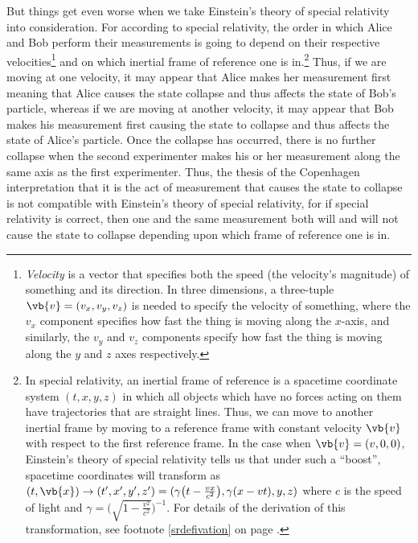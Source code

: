 \documentclass[12pt]{report}
\begin{document}
But things get even worse when we take Einstein's theory of special relativity into consideration. For according to special relativity, the order in which Alice and Bob perform their measurements is going to depend on their respective velocities\footnote{\label{Velocityfootnote}\emph{Velocity} is a vector that specifies both the speed (the velocity's magnitude) of something and its direction. In three dimensions, a three-tuple $\vb{v}=(v_x, v_y, v_z)$  %
%
is needed to specify the velocity of something, where the $v_x$ component specifies how fast the thing is moving along the $x$-axis, and similarly, the $v_y$ and $v_z$ components specify how fast the thing is moving along the $y$ and $z$ axes respectively.} and on which inertial frame of reference one is in.\footnote{\label{inertialfootnote}In special relativity, an inertial frame of reference is a spacetime coordinate system $(t, x, y, z)$   %
%
in which all objects which have no forces acting on them have trajectories that are straight lines. Thus, we can move to another inertial frame by moving to a reference frame with constant velocity $\vb{v}$ with respect to the first reference frame. In the case when $\vb{v}=(v, 0, 0)$, Einstein's theory of special relativity tells us that under such a “boost”, spacetime coordinates will transform as $(t,\vb{x})\rightarrow(t',x',y',z')=(\gamma\big(t - \frac{vx}{c^2}\big),\gamma(x-vt),y,z)$  %
%
where $c$  %
%
is the speed of light and $\gamma=\Big(\sqrt{1-\frac{v^2}{c^2}}\Big)^{-1}.$ For details of the derivation of this transformation, see footnote \ref{srdefivation} on page \pageref{srdefivation}.} Thus, if we are moving at one velocity, it may appear that Alice makes her measurement first meaning that Alice causes the state collapse and thus affects the state of Bob's particle, whereas if we are moving at another velocity, it may appear that Bob makes his measurement first causing the state to collapse and thus affects the state of Alice's particle. Once the collapse has occurred, there is no further collapse when the second experimenter makes his or her measurement along the same axis as the first experimenter. Thus, the thesis of the Copenhagen interpretation that it is the act of measurement that causes the state to collapse is not compatible with Einstein's theory of special relativity, for if special relativity is correct, then one and the same measurement both will and will not cause the state to collapse depending upon which frame of reference one is in.
\end{document}
